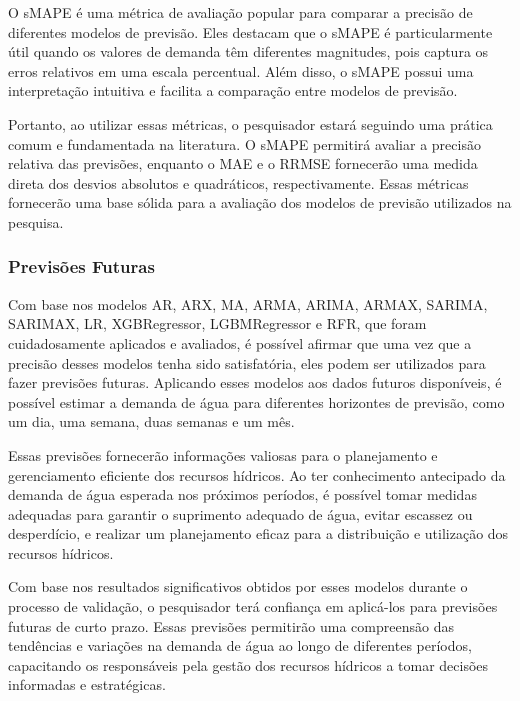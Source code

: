 \begin{quoting}[rightmargin=0cm,leftmargin=4cm]
	\begin{singlespace}
		{\footnotesize \noindent O sMAPE é uma métrica de avaliação popular para comparar a precisão de diferentes modelos de previsão. Eles destacam que o sMAPE é particularmente útil quando os valores de demanda têm diferentes magnitudes, pois captura os erros relativos em uma escala percentual. Além disso, o sMAPE possui uma interpretação intuitiva e facilita a comparação entre modelos de previsão. \cite{hyndman2006effect}
}
	\end{singlespace}
\end{quoting}


Portanto, ao utilizar essas métricas, o pesquisador estará seguindo uma prática comum e fundamentada na literatura. O sMAPE permitirá avaliar a precisão relativa das previsões, enquanto o MAE e o RRMSE fornecerão uma medida direta dos desvios absolutos e quadráticos, respectivamente. Essas métricas fornecerão uma base sólida para a avaliação dos modelos de previsão utilizados na pesquisa.


\subsubsection{Previs\~oes Futuras}


Com base nos modelos AR, ARX, MA, ARMA, ARIMA, ARMAX, SARIMA, SARIMAX, LR, XGBRegressor, LGBMRegressor e RFR, que foram cuidadosamente aplicados e avaliados, é possível afirmar que uma vez que a precisão desses modelos tenha sido satisfatória, eles podem ser utilizados para fazer previsões futuras. Aplicando esses modelos aos dados futuros disponíveis, é possível estimar a demanda de água para diferentes horizontes de previsão, como um dia, uma semana, duas semanas e um mês.

Essas previsões fornecerão informações valiosas para o planejamento e gerenciamento eficiente dos recursos hídricos. Ao ter conhecimento antecipado da demanda de água esperada nos próximos períodos, é possível tomar medidas adequadas para garantir o suprimento adequado de água, evitar escassez ou desperdício, e realizar um planejamento eficaz para a distribuição e utilização dos recursos hídricos.

Com base nos resultados significativos obtidos por esses modelos durante o processo de validação, o pesquisador terá confiança em aplicá-los para previsões futuras de curto prazo. Essas previsões permitirão uma compreensão das tendências e variações na demanda de água ao longo de diferentes períodos, capacitando os responsáveis pela gestão dos recursos hídricos a tomar decisões informadas e estratégicas.

